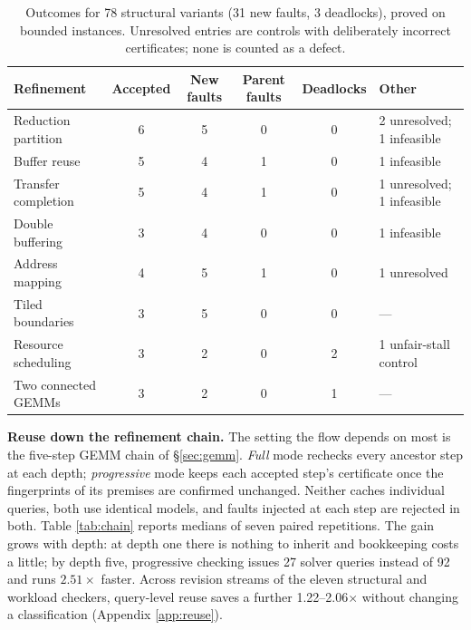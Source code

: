 \documentclass[11pt]{article}
\begin{document}
\begin{table}[tb]
\small
\centering
\begin{tabular}{@{}lccccl@{}}
\toprule
Refinement & Accepted & New faults & Parent faults & Deadlocks & Other \\
\midrule
Reduction partition & 6 & 5 & 0 & 0 & 2 unresolved; 1 infeasible \\
Buffer reuse & 5 & 4 & 1 & 0 & 1 infeasible \\
Transfer completion & 5 & 4 & 1 & 0 & 1 unresolved; 1 infeasible \\
Double buffering & 3 & 4 & 0 & 0 & 1 infeasible \\
Address mapping & 4 & 5 & 1 & 0 & 1 unresolved \\
Tiled boundaries & 3 & 5 & 0 & 0 & --- \\
Resource scheduling & 3 & 2 & 0 & 2 & 1 unfair-stall control \\
Two connected GEMMs & 3 & 2 & 0 & 1 & --- \\
\bottomrule
\end{tabular}
\caption{Outcomes for 78 structural variants (31 new faults, 3 deadlocks), proved on bounded instances. Unresolved entries are controls with deliberately incorrect certificates; none is counted as a defect.}
\label{tab:variants}
\end{table}

\textbf{Reuse down the refinement chain.} The setting the flow depends on most is the five-step GEMM chain of §\ref{sec:gemm}. \emph{Full} mode rechecks every ancestor step at each depth; \emph{progressive} mode keeps each accepted step's certificate once the fingerprints of its premises are confirmed unchanged. Neither caches individual queries, both use identical models, and faults injected at each step are rejected in both. Table \ref{tab:chain} reports medians of seven paired repetitions. The gain grows with depth: at depth one there is nothing to inherit and bookkeeping costs a little; by depth five, progressive checking issues 27 solver queries instead of 92 and runs \(2.51\times\) faster. Across revision streams of the eleven structural and workload checkers, query-level reuse saves a further 1.22--2.06\(\times\) without changing a classification (Appendix \ref{app:reuse}).
\end{document}
